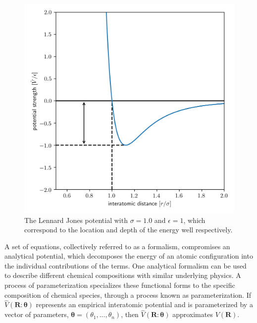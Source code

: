 \begin{figure}[h]
  \centering
    \includegraphics[width=5in]{chapter3/lj}
    \caption[The Lennard Jones Potential]{The Lennard Jones potential with $\sigma=1.0$ and $\epsilon=1$, which correspond to the location and depth of the energy well respectively.}
		\label{fig:lj_potential}
\end{figure}

A set of equations, collectively referred to as a formalism, compromises an analytical potential, which decomposes the energy of an atomic configuration into the individual contributions of the terms.
One analytical formalism can be used to describe different chemical compositions with similar underlying physics.  A process of parameterization specializes these functional forms to the specific composition of chemical species, through a process known as parameterization.
If $\hat{V}(\bm{R}:\bm{\theta})$ represents an empirical interatomic potential and is parameterized by a vector of parameters, $\bm{\theta}=(\theta_1,...,\theta_n)$, then $\hat{V}(\bm{R}:\bm{\theta})$ approximates $V(\bm{R})$.

